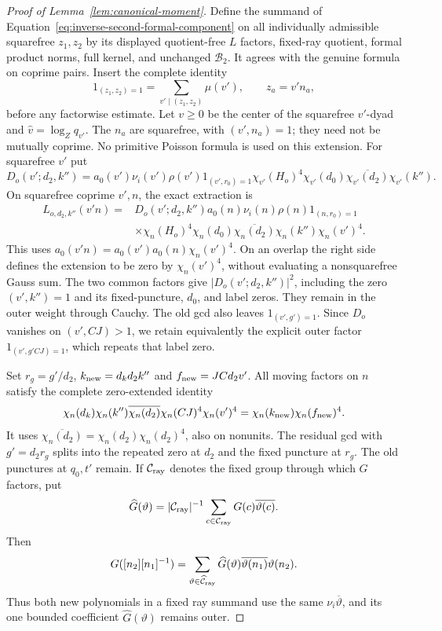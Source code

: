 \documentclass[11pt,a4paper]{article}
\numberwithin{equation}{section}
\numberwithin{figure}{section}
\theoremstyle{definition}
\theoremstyle{remark}
\begin{document}
\begin{proof}[Proof of Lemma~\ref{lem:canonical-moment}]
Define the summand of Equation~\eqref{eq:inverse-second-formal-component}
on all individually admissible squarefree \(z_1,z_2\) by its displayed
quotient-free \(L\) factors, fixed-ray quotient, formal product norms,
full kernel, and unchanged \(\mathcal B_2\).  It agrees with the
genuine formula on coprime pairs.  Insert the complete identity
\[
 1_{(z_1,z_2)=1}=\sum_{v'\mid(z_1,z_2)}\mu(v'),\qquad z_a=v'n_a,
\]
before any factorwise estimate.  Let \(v\ge0\) be the center of the
squarefree \(v'\)-dyad and \(\widehat v=\log_Zq_{v'}\).  The
\(n_a\) are squarefree, with \((v',n_a)=1\); they need not be mutually
coprime.  No primitive Poisson formula is used on this extension.
For squarefree \(v'\) put
\[
 D_o(v';d_2,k'')=a_0(v')\nu_i(v')\rho(v')1_{(v',r_0)=1}
   \chi_{v'}(H_o)^4\chi_{v'}(d_0)\overline{\chi_{v'}(d_2)}\chi_{v'}(k'').
\]
On squarefree coprime \(v',n\), the exact extraction is
\begin{equation}\label{eq:inverse-second-extraction}
 \begin{split}
 L_{o,d_2,k''}(v'n)={}&D_o(v';d_2,k'')a_0(n)\nu_i(n)\rho(n)1_{(n,r_0)=1}\\
 &\times\chi_n(H_o)^4\chi_n(d_0)\overline{\chi_n(d_2)}
          \chi_n(k'')\chi_n(v')^4.
 \end{split}
\end{equation}
This uses \(a_0(v'n)=a_0(v')a_0(n)\chi_n(v')^4\).  On an overlap the
right side defines the extension to be zero by \(\chi_n(v')^4\),
without evaluating a nonsquarefree Gauss sum.  The two common factors
give \(|D_o(v';d_2,k'')|^2\), including the zero \((v',k'')=1\) and
its fixed-puncture, \(d_0\), and label zeros.  They remain in the outer
weight through Cauchy.  The old gcd also leaves \(1_{(v',g')=1}\).
Since \(D_o\) vanishes on \((v',CJ)>1\), we retain equivalently the
explicit outer factor \(1_{(v',g'CJ)=1}\), which repeats that label zero.

Set \(r_g=g'/d_2\), \(k_{\rm new}=d_kd_2k''\) and
\(f_{\rm new}=JCd_2v'\).  All moving factors on \(n\) satisfy the
complete zero-extended identity
\begin{equation}\label{eq:inverse-moving-characters}
 \chi_n(d_k)\chi_n(k'')\overline{\chi_n(d_2)}
       \chi_n(CJ)^4\chi_n(v')^4
 =\chi_n(k_{\rm new})\chi_n(f_{\rm new})^4.
\end{equation}
It uses \(\overline{\chi_n(d_2)}=\chi_n(d_2)\chi_n(d_2)^4\), also on
nonunits.  The residual gcd with \(g'=d_2r_g\) splits into the repeated
zero at \(d_2\) and the fixed puncture at \(r_g\).  The old punctures
at \(q_0,t'\) remain.  If \(\mathcal C_{\rm ray}\) denotes the fixed
group through which \(G\) factors, put
\[
 \widehat G(\vartheta)=|\mathcal C_{\rm ray}|^{-1}
       \sum_{c\in\mathcal C_{\rm ray}}G(c)\overline{\vartheta(c)}.
\]
Then
\[
 G([n_2][n_1]^{-1})=\sum_{\vartheta\in\widehat{\mathcal C}_{\rm ray}}
   \widehat G(\vartheta)\overline{\vartheta(n_1)}\vartheta(n_2).
\]
Thus both new polynomials in a fixed ray summand use the same
\(\nu_i\overline\vartheta\), and its one bounded coefficient
\(\widehat G(\vartheta)\) remains outer.


\end{proof}
\end{document}
